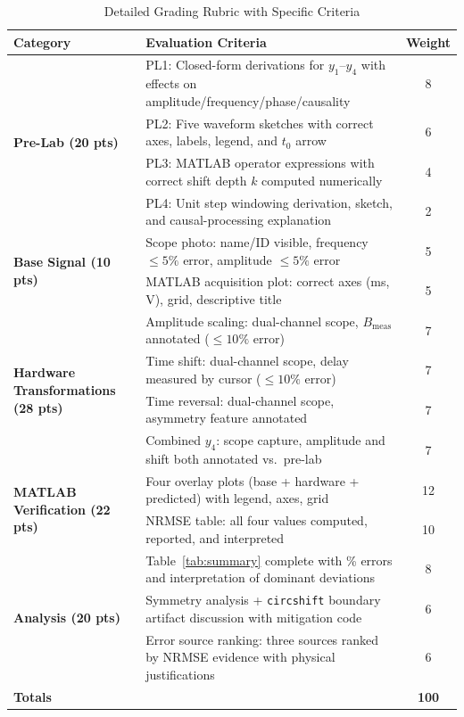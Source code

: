 \documentclass[11pt,letterpaper]{article}
\begin{document}
\begin{table}[H]
    \centering
    \caption{Detailed Grading Rubric with Specific Criteria}
    \label{tab:grading_detail}
    \begin{tabularx}{\linewidth}{l X c}
    \toprule
    \textbf{Category} & \textbf{Evaluation Criteria} & \textbf{Weight}\\
    \midrule
    \multirow{4}{*}{\textbf{Pre-Lab (20 pts)}}
        & PL1: Closed-form derivations for $y_1$--$y_4$ with effects on amplitude/frequency/phase/causality & 8 \\
        & PL2: Five waveform sketches with correct axes, labels, legend, and $t_0$ arrow & 6 \\
        & PL3: MATLAB operator expressions with correct shift depth $k$ computed numerically & 4 \\
        & PL4: Unit step windowing derivation, sketch, and causal-processing explanation & 2 \\
    \midrule
    \multirow{2}{*}{\textbf{Base Signal (10 pts)}}
        & Scope photo: name/ID visible, frequency $\leq 5\%$ error, amplitude $\leq 5\%$ error & 5 \\
        & MATLAB acquisition plot: correct axes (ms, V), grid, descriptive title & 5 \\
    \midrule
    \multirow{4}{*}{\textbf{Hardware Transformations (28 pts)}}
        & Amplitude scaling: dual-channel scope, $B_{\text{meas}}$ annotated ($\leq 10\%$ error) & 7 \\
        & Time shift: dual-channel scope, delay measured by cursor ($\leq 10\%$ error) & 7 \\
        & Time reversal: dual-channel scope, asymmetry feature annotated & 7 \\
        & Combined $y_4$: scope capture, amplitude and shift both annotated vs.\ pre-lab & 7 \\
    \midrule
    \multirow{2}{*}{\textbf{MATLAB Verification (22 pts)}}
        & Four overlay plots (base + hardware + predicted) with legend, axes, grid & 12 \\
        & NRMSE table: all four values computed, reported, and interpreted & 10 \\
    \midrule
    \multirow{3}{*}{\textbf{Analysis (20 pts)}}
        & Table~\ref{tab:summary} complete with \% errors and interpretation of dominant deviations & 8 \\
        & Symmetry analysis + \texttt{circshift} boundary artifact discussion with mitigation code & 6 \\
        & Error source ranking: three sources ranked by NRMSE evidence with physical justifications & 6 \\
    \midrule
    \textbf{Totals} & & \textbf{100}\\
    \bottomrule
    \end{tabularx}
\end{table}
\end{document}
